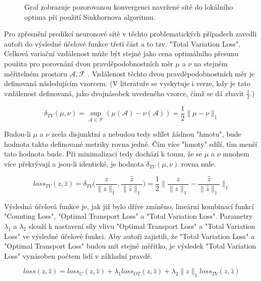 \begin{figure}[h!]
	\centering
	
	\caption{Graf zobrazuje pozorovanou konvergenci navržené sítě do lokálního optima při použití Sinkhornova algoritmu.}
	\label{fig:RNN_architecture}
\end{figure}

Pro zpřesnění predikcí neuronové sítě v těchto problematických případech zavedli autoři do výsledné účelové funkce třetí část a to tzv. "Total Variation Loss".
Celková variační vzdálenost může být stejně jako cena optimálního přesunu použita pro porovnání dvou pravděpodobnostních měr \(\mu\) a \(\nu\) na stejném měřitelném prostoru \(\mathcal{A}, \mathcal{F}\) \cite{Total_variation}.
Vzdálenost těchto dvou pravděpodobnostních měr je definovaná následujícím vzorcem. (V literatuře se vyskytuje i verze, kdy je tato vzdálenost definovaná, jako dvojnásobek uvedeného vzorce, čímž se dá zbavit \(\frac{1}{2}\).)

\begin{equation}
\delta_{TV}(\mu, \nu) = \sup_{\mathcal{A} \in \mathcal{F}} (\mu(\mathcal{A}) - \nu(\mathcal{A})) = \frac{1}{2}\|\mu - \nu\|_1
\label{eq:total_variation}
\end{equation}

Budou-li \(\mu\) a \(\nu\) zcela disjunktní a nebudou tedy sdílet žádnou "hmotu", bude hodnota takto definované metriky rovna jedné.
Čím více "hmoty" sdílí, tím menší tato hodnota bude.
Při minimalizaci tedy dochází k tomu, že se \(\mu\) a \(\nu\) mnohem více překrývají a jsou-li identické, je hodnota \(\delta_{TV}(\mu, \nu)\) rovna nule.

\begin{equation}
loss_{TV}(z, \hat{z}) = \delta_{TV} \bigg( \frac{z}{\|z\|_1}, \frac{\hat{z}}{\|\hat{z}\|_1} \bigg)
= \frac{1}{2} \bigg\| \frac{z}{\|z\|_1} - \frac{\hat{z}}{\|\hat{z}\|_1} \bigg\|_1
\label{eq:tv_loss}
\end{equation}


Výsledná účelová funkce je, jak již bylo dříve zmíněno, lineární kombinací funkcí "Counting Loss",  "Optimal Transport Loss" a "Total Variation Loss". Parametry \(\lambda_1\) a \(\lambda_2\) slouží k nastavení síly vlivu "Optimal Transport Loss" a "Total Variation Loss" ve výsledné účelové funkci.
Aby autoři zajistili, že "Total Variation Loss" a "Optimal Transport Loss" budou mít stejné měřítko, je výsledek "Total Variation Loss" vynásoben počtem lidí v základní pravdě.

\begin{equation}
loss(z, \hat{z}) = loss_{C}(z, \hat{z}) + \lambda_1 loss_{OT}(z, \hat{z}) + \lambda_2 \|z\|_1 loss_{TV}(z, \hat{z})
\label{eq:overall_loss}
\end{equation}



\endinput